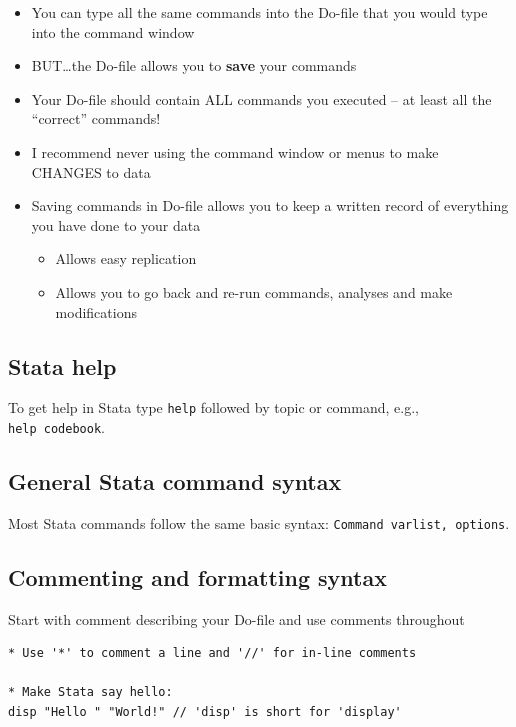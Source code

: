 \documentclass[]{book}
\providecommand{\tightlist}{%
  \setlength{\itemsep}{0pt}\setlength{\parskip}{0pt}}
\begin{document}
\begin{itemize}
\tightlist
\item
  You can type all the same commands into the Do-file that you would
  type into the command window
\item
  BUT\ldots{}the Do-file allows you to \textbf{save} your commands
\item
  Your Do-file should contain ALL commands you executed -- at least all
  the ``correct'' commands!
\item
  I recommend never using the command window or menus to make CHANGES to
  data
\item
  Saving commands in Do-file allows you to keep a written record of
  everything you have done to your data

  \begin{itemize}
  \tightlist
  \item
    Allows easy replication
  \item
    Allows you to go back and re-run commands, analyses and make
    modifications
  \end{itemize}
\end{itemize}

\subsection{Stata help}\label{stata-help}

To get help in Stata type \texttt{help} followed by topic or command,
e.g., \texttt{help\ codebook}.

\subsection{General Stata command
syntax}\label{general-stata-command-syntax}

Most Stata commands follow the same basic syntax:
\texttt{Command\ varlist,\ options}.

\subsection{Commenting and formatting
syntax}\label{commenting-and-formatting-syntax}

Start with comment describing your Do-file and use comments throughout

\begin{verbatim}
* Use '*' to comment a line and '//' for in-line comments

* Make Stata say hello:
disp "Hello " "World!" // 'disp' is short for 'display'
\end{verbatim}
\end{document}
